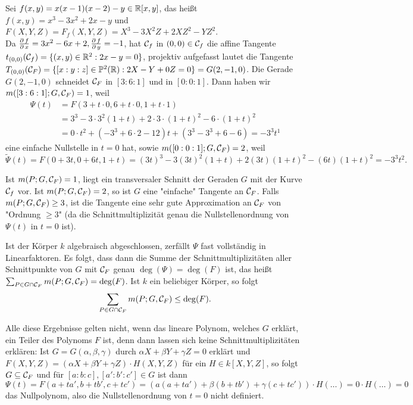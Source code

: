 \begin{bsp}
	Sei $f(x,y) = x(x-1)(x-2)-y \in \mathbb{R}[x,y]$, das heißt $f(x,y) = x^3 - 3x^2 + 2x - y$ und $F(X,Y,Z) = F_f(X,Y,Z) = X^3-3X^2Z + 2XZ^2-YZ^2$.\\
	Da $\frac{\operatorname{\partial} f}{\operatorname{\partial} x} = 3x^2 - 6x + 2, \frac{\operatorname{\partial} f}{\operatorname{\partial} y} = -1$, hat $\mathcal{C}_f$ in $(0,0) \in \mathcal{C}_f$ die affine Tangente $t_{(0,0)}(\mathcal{C}_f) = \{(x,y) \in \mathbb{R}^2 : 2x-y = 0\}$, projektiv aufgefasst lautet die Tangente $T_{(0,0)}(\mathcal{C}_F) = \{[x:y:z] \in \mathbb{P}^2(\mathbb{R}) : 2X-Y + 0Z = 0\} = G(2,-1,0)$. Die Gerade $G(2,-1,0)$ schneidet $\mathcal{C}_F$ in $[3:6:1]$ und in $[0:0:1]$. Dann haben wir $m([3:6:1];G,\mathcal{C}_F)=1$, weil
	\begin{equation}
	\begin{aligned}
		\Psi(t) &= F(3+t \cdot 0, 6 + t \cdot 0, 1 + t \cdot 1) \\
		&= 3^3 - 3 \cdot 3^2(1+t) + 2 \cdot 3 \cdot (1+t)^2 - 6 \cdot (1+t)^2 \\
		&= 0 \cdot t^2 + (-3^3 + 6 \cdot 2 - 12)t + (3^3 - 3^3 +6 -6) = -3^3 t^1
	\end{aligned}
	\end{equation}
	eine einfache Nullstelle in $t = 0$ hat, sowie $m([0:0:1];G,\mathcal{C}_F) = 2$, weil
	\[ \widetilde{\Psi}(t) = F(0+3t,0+6t,1+t) = (3t)^3 - 3(3t)^2(1+t)+2(3t)(1+t)^2-(6t)(1+t)^2 = -3^3 t^2.\]
\end{bsp}

\begin{erl}
	Ist $m(P;G,\mathcal{C}_F) = 1$, liegt ein transversaler Schnitt der Geraden $G$ mit der Kurve $\mathcal{C}_f$ vor. Ist $m(P;G,\mathcal{C}_F) = 2$, so ist $G$ eine "einfache" Tangente an $\mathcal{C}_F$. Falls $m(P;G,\mathcal{C}_F) \geq 3$, ist die Tangente eine sehr gute Approximation an $\mathcal{C}_F$ von "Ordnung $\geq 3$" (da die Schnittmultiplizität genau die Nullstellenordnung von $\Psi(t)$ in $t = 0$ ist).
\end{erl}

\begin{bem}
\label{bem_9.20}
	Ist der Körper $k$ algebraisch abgeschlossen, zerfällt $\Psi$ fast vollständig in Linearfaktoren. Es folgt, dass dann die Summe der Schnittmultiplizitäten aller Schnittpunkte von $G$ mit $\mathcal{C}_F$ genau $\deg(\Psi) = \deg(F)$ ist, das heißt $\sum_{P \in G \cap \mathcal{C}_F} m(P;G,\mathcal{C}_F) = \deg(F)$. Ist $k$ ein beliebiger Körper, so folgt
	\[ \sum_{P \in G \cap \mathcal{C}_F} m(P;G,\mathcal{C}_F) \leq \deg(F).\]
\end{bem}

\begin{bem}
	Alle diese Ergebnisse gelten nicht, wenn das lineare Polynom, welches $G$ erklärt, ein Teiler des Polynoms $F$ ist, denn dann lassen sich keine Schnittmultiplizitäten erklären: Ist $G = G(\alpha,\beta,\gamma)$ durch $\alpha X + \beta Y + \gamma Z = 0$ erklärt und $F(X,Y,Z) = (\alpha X + \beta Y + \gamma Z) \cdot H(X,Y,Z)$ für ein $H \in k[X,Y,Z]$, so folgt $G \subseteq \mathcal{C}_F$ und für $[a:b:c],[a' : b' : c'] \in G$ ist dann
	\[ \Psi(t) = F(a+ta', b+tb',c+tc') = (a(a+ta')+\beta(b+tb') + \gamma(c+tc')) \cdot H(\dots) = 0 \cdot H(\dots) = 0 \]
	das Nullpolynom, also die Nullstellenordnung von $t = 0$ nicht definiert.
\end{bem}

